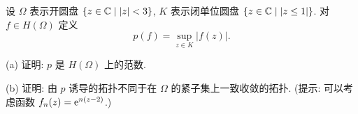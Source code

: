 

\begin{exercise}[5]
    设 $\varOmega$ 表示开圆盘 $\{z\in\mathbb{C}\mid |z|<3\}$, $K$ 表示闭单位圆盘 $\{z\in\mathbb{C}\mid |z\leq 1|\}$.
    对 $f\in H(\varOmega)$ 定义
    \[p(f)=\sup_{z\in K}|f(z)|.\]

    (a) 证明: $p$ 是 $H(\varOmega)$ 上的范数.

    (b) 证明: 由 $p$ 诱导的拓扑不同于在 $\varOmega$ 的紧子集上一致收敛的拓扑.
    (提示: 可以考虑函数 $f_n(z)=\mathrm{e}^{n(z-2)}$.)
\end{exercise}

